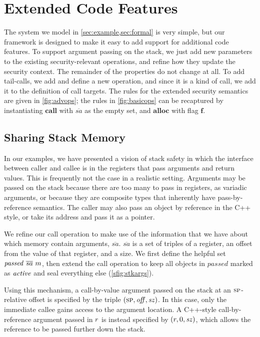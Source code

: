 \documentclass[10pt,conference]{ieeetran}%
\theoremstyle{definition}
\begin{document}
\section{Extended Code Features}
\label{sec:extensions}

The system we model in \cref{sec:example,sec:formal} is very simple, but our framework
is designed to make it easy to add support for additional code features. To support argument passing on the stack,
we just add new parameters to the existing security-relevant operations, and refine how they
update the security context. The remainder of the properties do not change at all.
To add tail-calls, we add and define a new operation, and since it is a kind of call,
we add it to the definition of call targets.
The rules for the extended security semantics are given in \cref{fig:advops}; the
rules in \cref{fig:basicops} can be recaptured by instantiating
\(\mathbf{call}\) with \(\overline{sa}\) as the empty set, and \(\mathbf{alloc}\)
with flag \(\mathbf{f}\).

\subsection{Sharing Stack Memory}
In our examples, we have presented a vision of stack safety in which
the interface between caller and callee is in the registers that pass
arguments and return values. This is frequently not the case in a realistic
setting. Arguments may be passed on the stack because there are too many
to pass in registers, as %
variadic arguments, or
because they are composite types that inherently have
pass-by-reference semantics. The caller may also pass an object by reference
in the C++ style, or take its address and pass it as a pointer.

We refine our call operation to make use of the information that we have about
which memory contain arguments, \(\overline{sa}\). \(\overline{sa}\) is a set of
triples of a register, an offset from the value of that register, and a size.
We first define the helpful set \(\mathit{passed} ~ \overline{sa} ~ m\),
then extend the call operation to keep all objects in \(\mathit{passed}\) marked
as \(\mathit{active}\) and seal everything else (\cref{sfig:stkargs}).

Using this mechanism, a call-by-value argument passed on the stack at an \(\textsc{sp}\)-relative offset
is specified by the triple \((\textsc{sp}, \mathit{off}, \mathit{sz})\).
In this case, only the immediate callee gains access to the argument location.
A C++-style call-by-reference argument %
passed in \(r\)
is instead specified by \((r, 0, \mathit{sz})\), which allows
the reference to be passed further down the stack.
\end{document}
